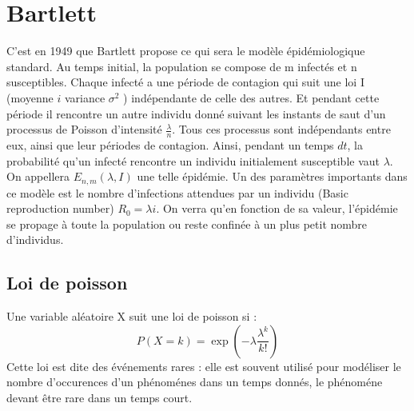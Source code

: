 \section{Bartlett}

C’est en 1949 que Bartlett propose ce qui sera le modèle épidémiologique standard. Au temps
initial, la population se compose de m infectés et n susceptibles. Chaque infecté a une période de
contagion qui suit une loi I (moyenne $i$ variance $\sigma^2$ ) indépendante de celle des autres. Et pendant
cette période il rencontre un autre individu donné suivant les instants de saut d’un processus de
Poisson d’intensité $\frac{\lambda}{n}$. Tous ces processus sont indépendants entre eux, ainsi que leur périodes de
contagion. Ainsi, pendant un temps $dt$, la probabilité qu’un infecté rencontre un individu initialement
susceptible vaut $\lambda$. On appellera $E_{n,m}(\lambda, I)$ une telle épidémie. Un des paramètres importants dans
ce modèle est le nombre d’infections attendues par un individu (Basic reproduction number) $R_0 =
\lambda i$. On verra qu’en fonction de sa valeur, l’épidémie se propage à toute la population ou reste
confinée à un plus petit nombre d’individus.

\subsection{Loi de poisson}

Une variable aléatoire X suit une loi de poisson si :
$$ P(X=k) = \exp(-\lambda \frac{\lambda^k}{k!}) $$
Cette loi est dite des événements rares : elle est souvent utilisé pour modéliser le nombre d'occurences d'un phénoménes dans un temps donnés, le phénoméne devant être rare dans un temps court.
